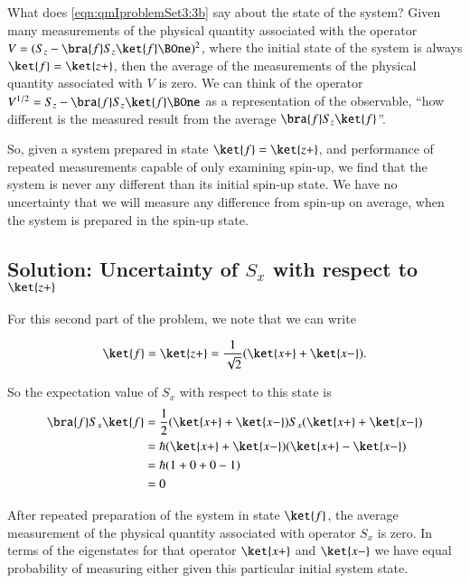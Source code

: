 
What does \ref{eqn:qmIproblemSet3:3b} say about the state of the system?  Given many measurements of the physical quantity associated with the operator $V = (S_z - \bra{f} S_z \ket{f} \BOne)^2$, where the initial state of the system is always $\ket{f} = \ket{z+}$, then the average of the measurements of the physical quantity associated with $V$ is zero.  We can think of the operator $V^{1/2} = S_z - \bra{f} S_z \ket{f} \BOne$ as a representation of the observable, ``how different is the measured result from the average $\bra{f} S_z \ket{f}$''.  

So, given a system prepared in state $\ket{f} = \ket{z+}$, and performance of repeated measurements capable of only examining spin-up, we find that the system is never any different than its initial spin-up state.  We have no uncertainty that we will measure any difference from spin-up on average, when the system is prepared in the spin-up state.

\subsection{Solution:  Uncertainty of $S_x$ with respect to $\ket{z+}$}

For this second part of the problem, we note that we can write

\begin{align}\label{eqn:qmIproblemSet3:20}
\ket{f} = \ket{z+} = \inv{\sqrt{2}} ( \ket{x+} + \ket{x-} ).
\end{align}

So the expectation value of $S_x$ with respect to this state is
\begin{align*}
\bra{f} S_x \ket{f}
&=
\inv{2}
( \ket{x+} + \ket{x-} ) S_x ( \ket{x+} + \ket{x-} ) \\
&=
\hbar 
( \ket{x+} + \ket{x-} ) ( \ket{x+} - \ket{x-} ) \\
&=
\hbar 
( 1 + 0 + 0 -1 ) \\
&= 0
\end{align*}

After repeated preparation of the system in state $\ket{f}$, the average measurement of the physical quantity associated with operator $S_x$ is zero.  In terms of the eigenstates for that operator $\ket{x+}$ and $\ket{x-}$ we have equal probability of measuring either given this particular initial system state.

